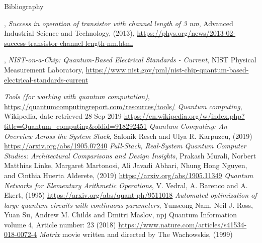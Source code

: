 \documentclass[handout]{beamer}
\begin{document}
\begin{frame}[allowframebreaks]{Bibliography}
\begin{thebibliography}{99}
  , %
    \emph{Success in operation of transistor with channel length of 3
      nm}, %
    Advanced Industrial Science and Technology, (2013), %
    \url{https://phys.org/news/2013-02-success-transistor-channel-length-nm.html}

  , %
    \emph{NIST-on-a-Chip: Quantum-Based Electrical Standards - Current}, %
    NIST Physical Measurement Laboratory, %
    \url{https://www.nist.gov/pml/nist-chip-quantum-based-electrical-standards-current}

    
    \emph{Tools (for working with quantum computation)}, %
    \url{https://quantumcomputingreport.com/resources/tools/}
    \emph{Quantum computing}, Wikipedia, date retrieved 28 Sep 2019 %
 \url{https://en.wikipedia.org/w/index.php?title=Quantum_computing&oldid=918292451}
    \emph{Quantum Computing: An Overview Across the System Stack}, %
    Salonik Resch and Ulya R. Karpuzcu, (2019) %
    \url{https://arxiv.org/abs/1905.07240}
    \emph{Full-Stack, Real-System Quantum Computer Studies: Architectural Comparisons and Design Insights}, %
    Prakash Murali, Norbert Matthias Linke, Margaret Martonosi, Ali Javadi Abhari, Nhung Hong Nguyen, and Cinthia Huerta Alderete, %
   (2019) \url{https://arxiv.org/abs/1905.11349}
    \emph{Quantum Networks for Elementary Arithmetic Operations}, %
    V. Vedral, A. Barenco and A. Ekert, (1995) %
    \url{https://arxiv.org/abs/quant-ph/9511018}
    \emph{Automated optimization of large quantum circuits with continuous
      parameters}, %
    Yunseong Nam, Neil J. Ross, Yuan Su, Andrew M. Childs and Dmitri Maslov, %
    npj Quantum Information volume 4, Article number: 23 (2018) %
    \url{https://www.nature.com/articles/s41534-018-0072-4}
    \emph{Matrix} movie written and directed by The Wachowskis, (1999)
  \end{thebibliography}
\end{frame}
\end{document}
